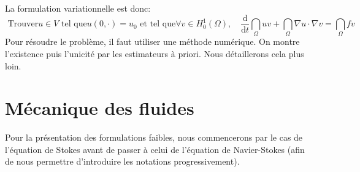 \medskip
La formulation variationnelle est donc:
\begin{equation}
\text{ Trouver} u\in V \text{ tel que} u(0,\cdot)=u_0 \text{ et tel que} \forall v\in H^1_0(\Omega),\quad
\dfrac{\mathrm d}{\mathrm dt}\dint_\Omega uv+\dint_\Omega \nabla u\cdot\nabla v=\dint_\Omega fv
\end{equation}
\medskip
Pour résoudre le problème, il faut utiliser une méthode numérique. On montre l'existence puis l'unicité par les estimateurs à priori.
Nous détaillerons cela plus loin.

\medskip
\section{Mécanique des fluides}
Pour la présentation des formulations faibles, nous commencerons par le cas de
l'équation de Stokes avant de passer à celui de l'équation de Navier-Stokes (afin
de nous permettre d'introduire les notations progressivement).


\medskip
